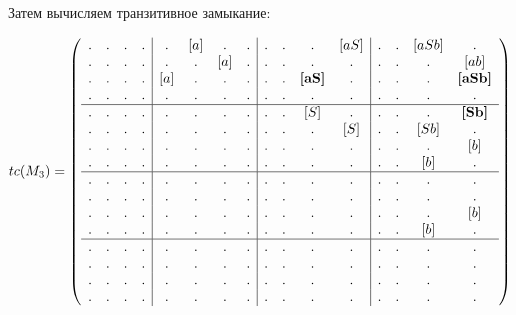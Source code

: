 \begin{example}
Затем вычисляем транзитивное замыкание:

\begin{align}
tc(M_3) =
\left(\begin{array}{c c c c | c c c c | c c c c | c c c c } 
. & . & . & .  &  . & [a] & . & .  &  . & . & . & [aS]           &  . & . & [aSb] & .     \\
. & . & . & .  &  . & . & [a] & .  &  . & . & . & .              &  . & . & .     & [ab]  \\
. & . & . & .  &  [a] & . & . & .  &  . & . & \textbf{[aS]} & .  &  . & . & .     & \textbf{[aSb]} \\
. & . & . & .  &  . & . & . & .    &  . & . & . & .              &  . & . & .     & .     \\
\hline
. & . & . & .  &  . & . & . & .    &  . & . & [S] & .            &  . & . & .    & \textbf{[Sb]}    \\
. & . & . & .  &  . & . & . & .    &  . & . & . & [S]            &  . & . & [Sb] & .    \\
. & . & . & .  &  . & . & . & .    &  . & . & . & .              &  . & . & .    & [b]  \\
. & . & . & .  &  . & . & . & .    &  . & . & . & .              &  . & . & [b]  & .    \\
\hline                                                              
. & . & . & .  &  . & . & . & .    &  . & . & . & .              &  . & . & . & .   \\
. & . & . & .  &  . & . & . & .    &  . & . & . & .              &  . & . & . & .   \\
. & . & . & .  &  . & . & . & .    &  . & . & . & .              &  . & . & . & [b] \\
. & . & . & .  &  . & . & . & .    &  . & . & . & .              &  . & . & [b] & . \\
\hline                                                              
. & . & . & .  &  . & . & . & .    &  . & . & . & .              &  . & . & . & .   \\
. & . & . & .  &  . & . & . & .    &  . & . & . & .              &  . & . & . & .   \\
. & . & . & .  &  . & . & . & .    &  . & . & . & .              &  . & . & . & .   \\
. & . & . & .  &  . & . & . & .    &  . & . & . & .              &  . & . & . & . 
\end{array}\right)
\label{eq:graph_tm}
\end{align}


\end{example}
